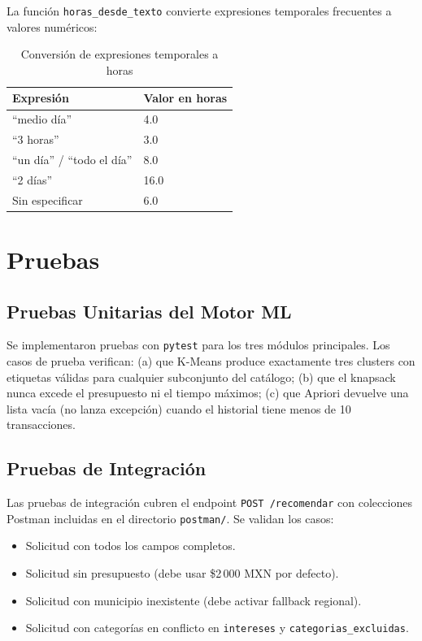 \documentclass[12pt,letterpaper]{report}
\begin{document}
La función \texttt{horas\_desde\_texto} convierte expresiones temporales frecuentes a valores
numéricos:

\begin{table}[H]
\centering
\caption{Conversión de expresiones temporales a horas}
\label{tab:tiempo}
\begin{tabular}{ll}
\toprule
\textbf{Expresión}       & \textbf{Valor en horas} \\
\midrule
``medio día''            & 4.0 \\
``3 horas''              & 3.0 \\
``un día'' / ``todo el día'' & 8.0 \\
``2 días''               & 16.0 \\
Sin especificar          & 6.0 \\
\bottomrule
\end{tabular}
\end{table}

\section{Pruebas}

\subsection{Pruebas Unitarias del Motor ML}

Se implementaron pruebas con \texttt{pytest} para los tres módulos principales. Los casos de
prueba verifican: (a) que K-Means produce exactamente tres clusters con etiquetas válidas para
cualquier subconjunto del catálogo; (b) que el knapsack nunca excede el presupuesto ni el
tiempo máximos; (c) que Apriori devuelve una lista vacía (no lanza excepción) cuando el
historial tiene menos de 10 transacciones.

\subsection{Pruebas de Integración}

Las pruebas de integración cubren el endpoint \texttt{POST /recomendar} con colecciones
Postman incluidas en el directorio \texttt{postman/}. Se validan los casos:

\begin{itemize}
  \item Solicitud con todos los campos completos.
  \item Solicitud sin presupuesto (debe usar \$2\,000 MXN por defecto).
  \item Solicitud con municipio inexistente (debe activar fallback regional).
  \item Solicitud con categorías en conflicto en \texttt{intereses} y \texttt{categorias\_excluidas}.
\end{itemize}
\end{document}
